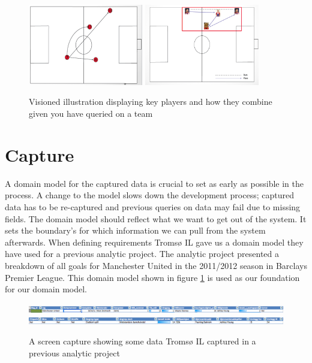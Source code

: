 \begin{figure}[ht!]
\centering
\includegraphics[width=50mm]{images/general/illustration_after_search2.png}
\includegraphics[width=50mm]{images/general/illustration_after_search.png}
\caption{Visioned illustration displaying key players and how they combine given you have queried on a team}
\end{figure}

\section{Capture}

A domain model for the captured data is crucial to set as early as possible in the process. A change to the model slows down the development process; captured data has to be re-captured and previous queries on data may fail due to missing fields. The domain model should reflect what we want to get out of the system. It sets the boundary's for which information we can pull from the system afterwards. When defining requirements Tromsø IL gave us a domain model they have used for a previous analytic project. The analytic project presented a breakdown of all goals for Manchester United in the 2011/2012 season in Barclays Premier League. This domain model shown in figure \ref{fig:prevdomainmodel} is used as our foundation for our domain model. 

\begin{figure}[ht!]
\centering
\includegraphics[width=1\textwidth]{images/general/prev_domain_model2.png}
\includegraphics[width=1\textwidth]{images/general/prev_domain_model1.png}
\caption{A screen capture showing some data Tromsø IL captured in a previous analytic project}
\label{fig:prevdomainmodel}
\end{figure}

